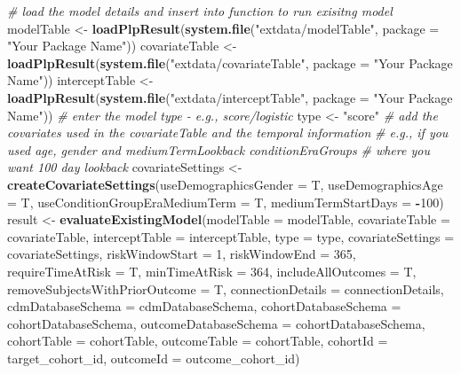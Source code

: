 \documentclass[]{article}
\newenvironment{Shaded}{\begin{snugshade}}{\end{snugshade}}
\newcommand{\KeywordTok}[1]{\textcolor[rgb]{0.13,0.29,0.53}{\textbf{#1}}}
\newcommand{\DataTypeTok}[1]{\textcolor[rgb]{0.13,0.29,0.53}{#1}}
\newcommand{\DecValTok}[1]{\textcolor[rgb]{0.00,0.00,0.81}{#1}}
\newcommand{\StringTok}[1]{\textcolor[rgb]{0.31,0.60,0.02}{#1}}
\newcommand{\CommentTok}[1]{\textcolor[rgb]{0.56,0.35,0.01}{\textit{#1}}}
\newcommand{\OperatorTok}[1]{\textcolor[rgb]{0.81,0.36,0.00}{\textbf{#1}}}
\newcommand{\NormalTok}[1]{#1}
\begin{document}
\begin{Shaded}
\begin{Highlighting}[]
\CommentTok{# load the model details and insert into function to run exisitng model}
\NormalTok{modelTable <-}\StringTok{ }\KeywordTok{loadPlpResult}\NormalTok{(}\KeywordTok{system.file}\NormalTok{(}\StringTok{"extdata/modelTable"}\NormalTok{, }\DataTypeTok{package =} \StringTok{"Your Package Name"}\NormalTok{))}
\NormalTok{covariateTable <-}\StringTok{ }\KeywordTok{loadPlpResult}\NormalTok{(}\KeywordTok{system.file}\NormalTok{(}\StringTok{"extdata/covariateTable"}\NormalTok{, }\DataTypeTok{package =} \StringTok{"Your Package Name"}\NormalTok{))}
\NormalTok{interceptTable <-}\StringTok{ }\KeywordTok{loadPlpResult}\NormalTok{(}\KeywordTok{system.file}\NormalTok{(}\StringTok{"extdata/interceptTable"}\NormalTok{, }\DataTypeTok{package =} \StringTok{"Your Package Name"}\NormalTok{))}
\CommentTok{# enter the model type - e.g., score/logistic}
\NormalTok{type <-}\StringTok{ "score"}
\CommentTok{# add the covariates used in the covariateTable and the temporal information}
\CommentTok{# e.g., if you used age, gender and mediumTermLookback conditionEraGroups}
\CommentTok{# where you want 100 day lookback}
\NormalTok{covariateSettings <-}\StringTok{ }\KeywordTok{createCovariateSettings}\NormalTok{(}\DataTypeTok{useDemographicsGender =}\NormalTok{ T, }\DataTypeTok{useDemographicsAge =}\NormalTok{ T, }
    \DataTypeTok{useConditionGroupEraMediumTerm =}\NormalTok{ T, }\DataTypeTok{mediumTermStartDays =} \OperatorTok{-}\DecValTok{100}\NormalTok{)}
\NormalTok{result <-}\StringTok{ }\KeywordTok{evaluateExistingModel}\NormalTok{(}\DataTypeTok{modelTable =}\NormalTok{ modelTable, }\DataTypeTok{covariateTable =}\NormalTok{ covariateTable, }
    \DataTypeTok{interceptTable =}\NormalTok{ interceptTable, }\DataTypeTok{type =}\NormalTok{ type, }\DataTypeTok{covariateSettings =}\NormalTok{ covariateSettings, }
    \DataTypeTok{riskWindowStart =} \DecValTok{1}\NormalTok{, }\DataTypeTok{riskWindowEnd =} \DecValTok{365}\NormalTok{, }\DataTypeTok{requireTimeAtRisk =}\NormalTok{ T, }\DataTypeTok{minTimeAtRisk =} \DecValTok{364}\NormalTok{, }
    \DataTypeTok{includeAllOutcomes =}\NormalTok{ T, }\DataTypeTok{removeSubjectsWithPriorOutcome =}\NormalTok{ T, }\DataTypeTok{connectionDetails =}\NormalTok{ connectionDetails, }
    \DataTypeTok{cdmDatabaseSchema =}\NormalTok{ cdmDatabaseSchema, }\DataTypeTok{cohortDatabaseSchema =}\NormalTok{ cohortDatabaseSchema, }
    \DataTypeTok{outcomeDatabaseSchema =}\NormalTok{ cohortDatabaseSchema, }\DataTypeTok{cohortTable =}\NormalTok{ cohortTable, }
    \DataTypeTok{outcomeTable =}\NormalTok{ cohortTable, }\DataTypeTok{cohortId =}\NormalTok{ target_cohort_id, }\DataTypeTok{outcomeId =}\NormalTok{ outcome_cohort_id)}


\end{Highlighting}
\end{Shaded}
\end{document}
